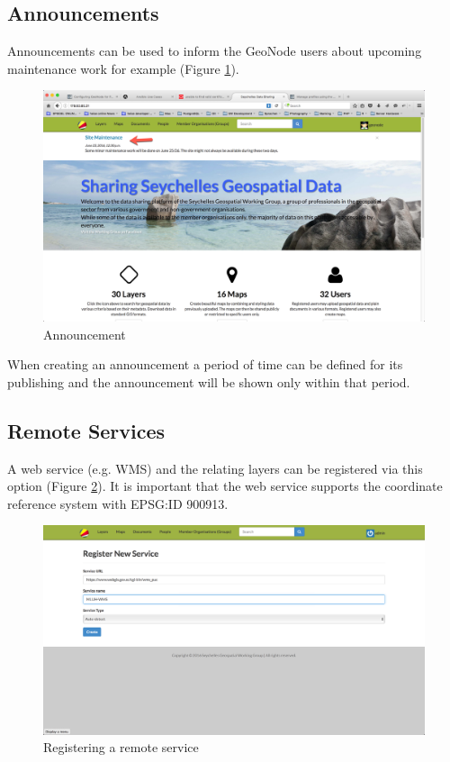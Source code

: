 \documentclass[a4paper,12pt,titlepage]{article}
\begin{document}
\subsection{Announcements}

Announcements can be used to inform the GeoNode users about upcoming maintenance work for example (Figure \ref{fig:announcement}).

\begin{figure}[H]
	\centering
	\includegraphics[width=12cm]{Images/announcement.png}
	\caption{Announcement}\label{fig:announcement}
\end{figure}

When creating an announcement a period of time can be defined for its publishing and the announcement will be shown only within that period.

\subsection{Remote Services}

A web service (e.g. WMS) and the relating layers can be registered via this option (Figure \ref{fig:register_service}). It is important that the web service supports the coordinate reference system with EPSG:ID 900913.

\begin{figure}[H]
	\centering
	\includegraphics[width=12cm]{Images/register_service.png}
	\caption{Registering a remote service}\label{fig:register_service}
\end{figure}
\end{document}
